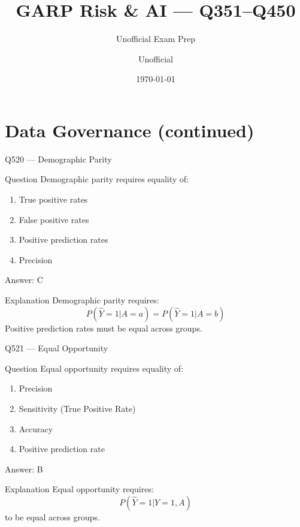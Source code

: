 \documentclass[aspectratio=169,8pt]{beamer}
\title[GARP RAI]{GARP Risk \& AI --- Q351--Q450}
\subtitle{Unofficial Exam Prep}
\author{Unofficial}
\date{\today}
\begin{document}
	
	\begin{frame}
		\titlepage
	\end{frame}
	
	\section{Data Governance (continued)}
	



\begin{frame}{Q520 --- Demographic Parity}
	\begin{block}{Question}
		Demographic parity requires equality of:
		\begin{enumerate}
			\item True positive rates
			\item False positive rates
			\item Positive prediction rates
			\item Precision
		\end{enumerate}
	\end{block}
	\begin{exampleblock}{Answer: C}\end{exampleblock}
	\begin{block}{Explanation}
		Demographic parity requires:
		\[
		P(\hat{Y}=1|A=a)
		=
		P(\hat{Y}=1|A=b)
		\]
		Positive prediction rates must be equal across groups.
	\end{block}
\end{frame}

\begin{frame}{Q521 --- Equal Opportunity}
	\begin{block}{Question}
		Equal opportunity requires equality of:
		\begin{enumerate}
			\item Precision
			\item Sensitivity (True Positive Rate)
			\item Accuracy
			\item Positive prediction rate
		\end{enumerate}
	\end{block}
	\begin{exampleblock}{Answer: B}\end{exampleblock}
	\begin{block}{Explanation}
		Equal opportunity requires:
		\[
		P(\hat{Y}=1|Y=1,A)
		\]
		to be equal across groups.
	\end{block}
\end{frame}
\end{document}

